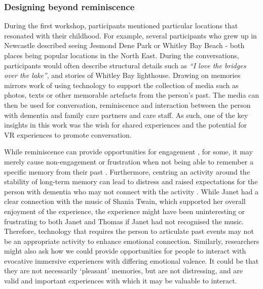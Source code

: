 \subsubsection{Designing beyond reminiscence}
\label{ReminiscencevsMoment}
During the first workshop, participants mentioned particular locations that resonated with their childhood. For example, several participants who grew up in Newcastle described seeing Jesmond Dene Park or Whitley Bay Beach - both places being popular locations in the North East. During the conversations, participants would often describe structural details such as \textit{``I love the bridges over the lake''}, and stories of Whitley Bay lighthouse. Drawing on memories mirrors \cite{astell_stimulating_2010} work of using technology to support the collection of media such as photos, texts or other memorable artefacts from the person's past. The media can then be used for conversation, reminiscence and interaction between the person with dementia and family care partners and care staff. As such, one of the key insights in this work was the wish for shared experiences and the potential for VR experiences to promote conversation. 

While reminiscence can provide opportunities for engagement \citep{gowans_designing_2004, yasuda_effectiveness_2009}, for some, it may merely cause non-engagement or frustration when not being able to remember a specific memory from their past \citep{lazar_critical_2017}. Furthermore, centring an activity around the stability of long-term memory can lead to distress and raised expectations for the person with dementia who may not connect with the activity \citep{alm_communication_2007}. While Janet had a clear connection with the music of Shania Twain, which supported her overall enjoyment of the experience, the experience might have been uninteresting or frustrating to both Janet and Thomas if Janet had not recognised the music. Therefore, technology that requires the person to articulate past events may not be an appropriate activity to enhance emotional connection. Similarly, researchers might also ask how we could provide opportunities for people to interact with evocative immersive experiences with differing emotional valence. It could be that they are not necessarily ‘pleasant’ memories, but are not distressing, and are valid and important experiences with which it may be valuable to interact.

